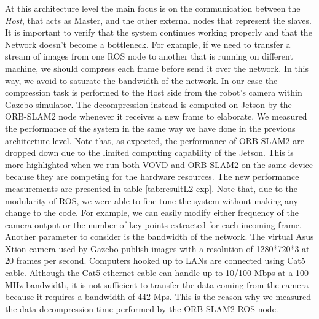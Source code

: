 At this architecture level the main focus is on the communication between the \textit{Host}, that acts as Master, and the other external nodes that represent the slaves. It is important to verify that the system continues working properly and that the Network doesn't become a bottleneck. For example, if we need to transfer a stream of images from one ROS node to another that is running on different machine, we should compress each frame before send it over the network. In this way, we avoid to saturate the bandwidth of the network. In our case the compression task is performed to the Host side from the robot's camera within Gazebo simulator. The decompression instead is computed on Jetson by the ORB-SLAM2 node whenever it receives a new frame to elaborate.
We measured the performance of the system in the same way we have done in the previous architecture level.
Note that, as expected, the performance of ORB-SLAM2 are dropped down due to the limited computing capability of the Jetson. This is more highlighted when we run both VOVD and ORB-SLAM2 on the same device because they are competing for the hardware resources.
The new performance measurements are presented in table \ref{tab:resultL2-exp}.
Note that, due to the modularity of ROS, we were able to fine tune the system without making any change to the code. For example, we can easily modify either frequency of the camera output or the number of key-points extracted for each incoming frame.
Another parameter to consider is the bandwidth of the network. The virtual Asus Xtion camera used by Gazebo publish images with a resolution of 1280*720*3 at 20 frames per second.
Computers hooked up to LANs are connected using Cat5 cable. Although the Cat5 ethernet cable can handle up to 10/100 Mbps at a 100 MHz bandwidth, it is not sufficient to transfer the data coming from the camera because it requires a bandwidth of 442 Mps.
This is the reason why we measured the data decompression time performed by the ORB-SLAM2 ROS node.

